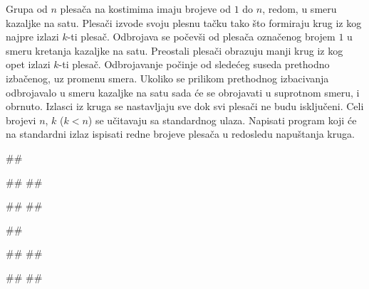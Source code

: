 \begin{Exercise}[label=613]
Grupa od $n$ plesača na kostimima imaju brojeve od $1$ do $n$, redom, u smeru kazaljke na satu.
Plesači izvode svoju plesnu tačku tako što formiraju krug iz kog najpre izlazi $k$-ti plesač.
Odbrojava se počevši od plesača označenog brojem $1$ u smeru kretanja kazaljke na satu. 
Preostali plesači obrazuju manji krug iz kog opet izlazi $k$-ti plesač. Odbrojavanje počinje od
sledećeg suseda prethodno izbačenog, uz promenu smera. Ukoliko se prilikom prethodnog izbacivanja odbrojavalo 
u smeru kazaljke na satu sada će se obrojavati u suprotnom smeru, i obrnuto. Izlasci iz kruga se nastavljaju
sve dok svi plesači ne budu isključeni. 
Celi brojevi $n$, $k$ ($k < n$) se učitavaju sa standardnog ulaza. 
Napisati program koji će na standardni izlaz ispisati redne brojeve plesača u redosledu napuštanja kruga. 

\begin{minitest}
\begin{test}{1}
##

#\naslovUlaz#
##

#\naslovIzlaz# 
##
\end{test}
\end{minitest}
\begin{minitest}
\begin{test}{2}
##

#\naslovUlaz#
##

#\naslovIzlaz# 
## 
\end{test}
\end{minitest}
\end{Exercise}
\begin{Answer}[ref=613]
\end{Answer}